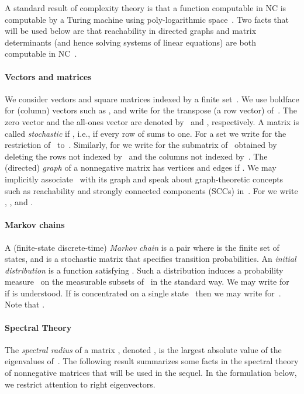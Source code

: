 \documentclass{elsarticle}
\begin{document}
A standard result of complexity theory is that a function computable
in NC is computable by a Turing machine using poly-logarithmic
space~\cite[Theorem 4]{Borodin77}.  Two facts that will be used below
are that reachability in directed graphs and matrix determinants (and
hence solving systems of linear equations) are both computable in
NC~\cite{Pap94}.

\paragraph*{Vectors and matrices}
We consider vectors and square matrices indexed by a finite set~.
We use boldface for (column) vectors such as ,
and write  for the transpose (a row vector)
of~.  The zero vector and the all-ones vector are denoted
by~ and , respectively.  A matrix
 is called \emph{stochastic} if
, i.e., if every row of  sums to one.  For a
set  we write  for the
restriction of~ to~.  Similarly, for  we
write  for the submatrix of~ obtained by deleting the rows
not indexed by~ and the columns not indexed by~.  The (directed)
\emph{graph} of a nonnegative matrix  has
vertices  and edges  if .  We may
implicitly associate~ with its graph and speak about
graph-theoretic concepts such as reachability and strongly connected
components (SCCs) in~.  For  we write
,
, and
.





\paragraph*{Markov chains}
A (finite-state discrete-time) \emph{Markov chain} is a pair
 where  is the finite set of states, and
 is a stochastic matrix that specifies
transition probabilities.  An \emph{initial distribution} is a
function  satisfying
.  Such a distribution induces a
probability measure~ on the measurable subsets
of~ in the standard way.
We may write  for~ if  is understood.
If  is concentrated on a
single state~ then we may write 
for~.  Note that
.

\paragraph*{Spectral Theory}
The \emph{spectral radius} of a matrix ,
denoted , is the largest absolute value of the eigenvalues
of~.  The following result summarizes some facts in the spectral
theory of nonnegative matrices that will be used in the sequel.
In the
formulation below, we restrict attention to right eigenvectors.
\end{document}
